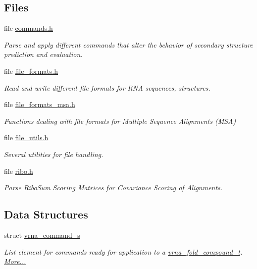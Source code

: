 \subsection*{Files}
\begin{DoxyCompactItemize}
\item 
file \hyperlink{commands_8h}{commands.\+h}
\begin{DoxyCompactList}\small\item\em Parse and apply different commands that alter the behavior of secondary structure prediction and evaluation. \end{DoxyCompactList}\item 
file \hyperlink{file__formats_8h}{file\+\_\+formats.\+h}
\begin{DoxyCompactList}\small\item\em Read and write different file formats for R\+NA sequences, structures. \end{DoxyCompactList}\item 
file \hyperlink{file__formats__msa_8h}{file\+\_\+formats\+\_\+msa.\+h}
\begin{DoxyCompactList}\small\item\em Functions dealing with file formats for Multiple Sequence Alignments (M\+SA) \end{DoxyCompactList}\item 
file \hyperlink{file__utils_8h}{file\+\_\+utils.\+h}
\begin{DoxyCompactList}\small\item\em Several utilities for file handling. \end{DoxyCompactList}\item 
file \hyperlink{ribo_8h}{ribo.\+h}
\begin{DoxyCompactList}\small\item\em Parse Ribo\+Sum Scoring Matrices for Covariance Scoring of Alignments. \end{DoxyCompactList}\end{DoxyCompactItemize}
\subsection*{Data Structures}
\begin{DoxyCompactItemize}
\item 
struct \hyperlink{group__file__utils_structvrna__command__s}{vrna\+\_\+command\+\_\+s}
\begin{DoxyCompactList}\small\item\em List element for commands ready for application to a \hyperlink{group__fold__compound_ga1b0cef17fd40466cef5968eaeeff6166}{vrna\+\_\+fold\+\_\+compound\+\_\+t}.  \hyperlink{group__file__utils_structvrna__command__s}{More...}\end{DoxyCompactList}\end{DoxyCompactItemize}
